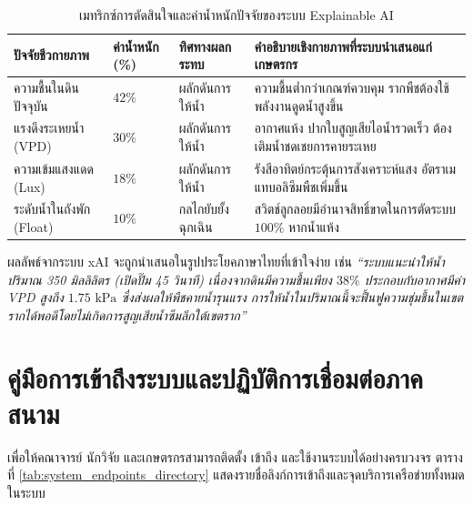 \begin{table}[H]
\centering
\caption{เมทริกซ์การตัดสินใจและค่าน้ำหนักปัจจัยของระบบ Explainable AI}
\label{tab:xai_feature_attributions}
\begin{tabularx}{\textwidth}{p{3.2cm}p{2.2cm}p{2.5cm}Y}
\toprule
\textbf{ปัจจัยชีวกายภาพ} & \textbf{ค่าน้ำหนัก (\%)} & \textbf{ทิศทางผลกระทบ} & \textbf{คำอธิบายเชิงกายภาพที่ระบบนำเสนอแก่เกษตรกร} \\
\midrule
ความชื้นในดินปัจจุบัน & $42\%$ & ผลักดันการให้น้ำ & ความชื้นต่ำกว่าเกณฑ์ควบคุม รากพืชต้องใช้พลังงานดูดน้ำสูงขึ้น \\
แรงดึงระเหยน้ำ (VPD) & $30\%$ & ผลักดันการให้น้ำ & อากาศแห้ง ปากใบสูญเสียไอน้ำรวดเร็ว ต้องเติมน้ำชดเชยการคายระเหย \\
ความเข้มแสงแดด (Lux) & $18\%$ & ผลักดันการให้น้ำ & รังสีอาทิตย์กระตุ้นการสังเคราะห์แสง อัตราเมแทบอลิซึมพืชเพิ่มขึ้น \\
ระดับน้ำในถังพัก (Float) & $10\%$ & กลไกยับยั้งฉุกเฉิน & สวิตช์ลูกลอยมีอำนาจสิทธิ์ขาดในการตัดระบบ $100\%$ หากน้ำแห้ง \\
\bottomrule
\end{tabularx}
\end{table}

ผลลัพธ์จากระบบ xAI จะถูกนำเสนอในรูปประโยคภาษาไทยที่เข้าใจง่าย เช่น \textit{``ระบบแนะนำให้น้ำปริมาณ 350 มิลลิลิตร (เปิดปั๊ม 45 วินาที) เนื่องจากดินมีความชื้นเพียง $38\%$ ประกอบกับอากาศมีค่า VPD สูงถึง $1.75\text{ kPa}$ ซึ่งส่งผลให้พืชคายน้ำรุนแรง การให้น้ำในปริมาณนี้จะฟื้นฟูความชุ่มชื้นในเขตรากได้พอดีโดยไม่เกิดการสูญเสียน้ำซึมลึกใต้เขตราก''}

\section{คู่มือการเข้าถึงระบบและปฏิบัติการเชื่อมต่อภาคสนาม}

เพื่อให้คณาจารย์ นักวิจัย และเกษตรกรสามารถติดตั้ง เข้าถึง และใช้งานระบบได้อย่างครบวงจร ตารางที่ \ref{tab:system_endpoints_directory} แสดงรายชื่อลิงก์การเข้าถึงและจุดบริการเครือข่ายทั้งหมดในระบบ

